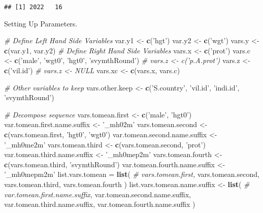 \documentclass[
]{book}
\newenvironment{Shaded}{\begin{snugshade}}{\end{snugshade}}
\newcommand{\CommentTok}[1]{\textcolor[rgb]{0.56,0.35,0.01}{\textit{#1}}}
\newcommand{\KeywordTok}[1]{\textcolor[rgb]{0.13,0.29,0.53}{\textbf{#1}}}
\newcommand{\NormalTok}[1]{#1}
\newcommand{\StringTok}[1]{\textcolor[rgb]{0.31,0.60,0.02}{#1}}
\begin{document}
\begin{verbatim}
## [1] 2022   16
\end{verbatim}

Setting Up Parameters.

\begin{Shaded}
\begin{Highlighting}[]
\CommentTok{# Define Left Hand Side Variables}
\NormalTok{var.y1 <-}\StringTok{ }\KeywordTok{c}\NormalTok{(}\StringTok{'hgt'}\NormalTok{)}
\NormalTok{var.y2 <-}\StringTok{ }\KeywordTok{c}\NormalTok{(}\StringTok{'wgt'}\NormalTok{)}
\NormalTok{vars.y <-}\StringTok{ }\KeywordTok{c}\NormalTok{(var.y1, var.y2)}
\CommentTok{# Define Right Hand Side Variables}
\NormalTok{vars.x <-}\StringTok{ }\KeywordTok{c}\NormalTok{(}\StringTok{'prot'}\NormalTok{)}
\NormalTok{vars.c <-}\StringTok{ }\KeywordTok{c}\NormalTok{(}\StringTok{'male'}\NormalTok{, }\StringTok{'wgt0'}\NormalTok{, }\StringTok{'hgt0'}\NormalTok{, }\StringTok{'svymthRound'}\NormalTok{)}
\CommentTok{# vars.z <- c('p.A.prot')}
\NormalTok{vars.z <-}\StringTok{ }\KeywordTok{c}\NormalTok{(}\StringTok{'vil.id'}\NormalTok{)}
\CommentTok{# vars.z <- NULL}
\NormalTok{vars.xc <-}\StringTok{ }\KeywordTok{c}\NormalTok{(vars.x, vars.c)}

\CommentTok{# Other variables to keep}
\NormalTok{vars.other.keep <-}\StringTok{ }\KeywordTok{c}\NormalTok{(}\StringTok{'S.country'}\NormalTok{, }\StringTok{'vil.id'}\NormalTok{, }\StringTok{'indi.id'}\NormalTok{, }\StringTok{'svymthRound'}\NormalTok{)}

\CommentTok{# Decompose sequence}
\NormalTok{vars.tomean.first <-}\StringTok{ }\KeywordTok{c}\NormalTok{(}\StringTok{'male'}\NormalTok{, }\StringTok{'hgt0'}\NormalTok{)}
\NormalTok{var.tomean.first.name.suffix <-}\StringTok{ '_mh02m'}
\NormalTok{vars.tomean.second <-}\StringTok{ }\KeywordTok{c}\NormalTok{(vars.tomean.first, }\StringTok{'hgt0'}\NormalTok{, }\StringTok{'wgt0'}\NormalTok{)}
\NormalTok{var.tomean.second.name.suffix <-}\StringTok{ '_mh0me2m'}
\NormalTok{vars.tomean.third <-}\StringTok{ }\KeywordTok{c}\NormalTok{(vars.tomean.second, }\StringTok{'prot'}\NormalTok{)}
\NormalTok{var.tomean.third.name.suffix <-}\StringTok{ '_mh0mep2m'}
\NormalTok{vars.tomean.fourth <-}\StringTok{ }\KeywordTok{c}\NormalTok{(vars.tomean.third, }\StringTok{'svymthRound'}\NormalTok{)}
\NormalTok{var.tomean.fourth.name.suffix <-}\StringTok{ '_mh0mepm2m'}
\NormalTok{list.vars.tomean =}\StringTok{ }\KeywordTok{list}\NormalTok{(}
\CommentTok{#                         vars.tomean.first,}
\NormalTok{                        vars.tomean.second,}
\NormalTok{                        vars.tomean.third,}
\NormalTok{                        vars.tomean.fourth}
\NormalTok{                        )}
\NormalTok{list.vars.tomean.name.suffix <-}\StringTok{ }\KeywordTok{list}\NormalTok{(}
\CommentTok{#                                     var.tomean.first.name.suffix,}
\NormalTok{                                     var.tomean.second.name.suffix,}
\NormalTok{                                     var.tomean.third.name.suffix,}
\NormalTok{                                     var.tomean.fourth.name.suffix}
\NormalTok{                                    )}
\end{Highlighting}
\end{Shaded}
\end{document}
